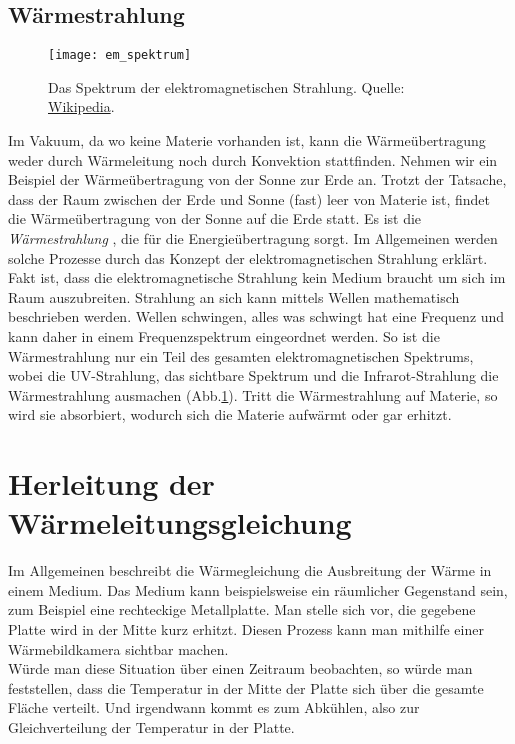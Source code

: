 \subsection{Wärmestrahlung}

\begin{figure}[!h]
	\centering
	\texttt{[image: em\_spektrum]}
	\caption{Das Spektrum der elektromagnetischen Strahlung. Quelle: \href{https://de.wikipedia.org/wiki/Elektromagnetisches_Spektrum}{Wikipedia}.}
	\label{fig:1.1}
\end{figure}

Im Vakuum, da wo keine Materie vorhanden ist, kann die Wärmeübertragung weder durch Wärmeleitung noch durch Konvektion stattfinden. Nehmen wir ein Beispiel der Wärmeübertragung von der Sonne zur Erde an. Trotzt der Tatsache, dass der Raum zwischen der Erde und Sonne (fast) leer von Materie ist, findet die Wärmeübertragung von der Sonne auf die Erde statt. Es ist die \textit{Wärmestrahlung }, die für die Energieübertragung sorgt. Im Allgemeinen werden solche Prozesse durch das Konzept der elektromagnetischen Strahlung erklärt. Fakt ist, dass die elektromagnetische Strahlung kein Medium braucht um sich im Raum auszubreiten. Strahlung an sich kann mittels Wellen mathematisch beschrieben werden. Wellen schwingen, alles was schwingt hat eine Frequenz und kann daher in einem Frequenzspektrum eingeordnet werden. So ist die Wärmestrahlung nur ein Teil des gesamten elektromagnetischen Spektrums, wobei die UV-Strahlung, das sichtbare Spektrum und die Infrarot-Strahlung die Wärmestrahlung ausmachen (Abb.\ref{fig:1.1}). Tritt die Wärmestrahlung auf Materie, so wird sie absorbiert, wodurch sich die Materie aufwärmt oder gar erhitzt.


\section{Herleitung der Wärmeleitungsgleichung}

Im Allgemeinen beschreibt die Wärmegleichung die Ausbreitung der Wärme in einem Medium. Das Medium kann beispielsweise ein räumlicher Gegenstand sein, zum Beispiel eine rechteckige Metallplatte. Man stelle sich vor, die gegebene Platte wird in der Mitte kurz erhitzt. Diesen Prozess kann man mithilfe einer Wärmebildkamera sichtbar machen.\\

Würde man diese Situation über einen Zeitraum beobachten, so würde man feststellen, dass die Temperatur in der Mitte der Platte sich über die gesamte Fläche verteilt. Und irgendwann kommt es zum Abkühlen, also zur Gleichverteilung der Temperatur in der Platte.\\

